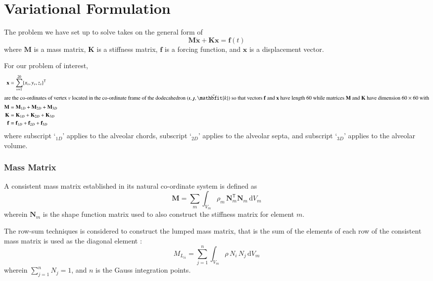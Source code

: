 \setcounter{section}{0}
\part{Variational Formulation}
\label{partVariational}

The problem we have set up to solve takes on the general form of 
\begin{equation}
	\mathbf{M} \ddot{\mathbf{x}} + \mathbf{K} \mathbf{x} = \mathbf{f}(t)
\end{equation}
where $\mathbf{M}$ is a mass matrix, $\mathbf{K}$ is a stiffness matrix, $\mathbf{f}$ is a forcing function, and $\mathbf{x}$ is a displacement vector.  

For our problem of interest, 
\begin{subequations}
\begin{align}
	\mathbf{x} & = \sum_{v=1}^{20} \{ x_v , y_v , z_v \}^{\mathsf{T}} \\
	\intertext{are the co-ordinates of vertex $v$ located in the co-ordinate frame of the dodecahedron $(\boldsymbol{\imath} , \boldsymbol{\jmath} , \vec{\mathbfit{k}} )$ so that vectors $\mathbf{f}$ and $\mathbf{x}$ have length 60 while matrices $\mathbf{M}$ and $\mathbf{K}$ have dimension $60 \times 60$ with}
	\mathbf{M} & = \mathbf{M}_{1D} + \mathbf{M}_{2D} + \mathbf{M}_{3D} \\
	\mathbf{K} & = \mathbf{K}_{1D} + \mathbf{K}_{2D} + \mathbf{K}_{3D} \\
	\mathbf{f} & = \mathbf{f}_{1D} + \mathbf{f}_{2D} + \mathbf{f}_{3D}
\end{align}
\end{subequations}
where subscript `$\mbox{}_{1D}$' applies to the alveolar chords, subscript `$\mbox{}_{2D}$' applies to the alveolar septa, and subscript `$\mbox{}_{3D}$' applies to the alveolar volume.

\section{Mass Matrix}
A consistent mass matrix \cite{Archer65} established in its natural co-ordinate system is defined as
\begin{equation}
	\mathbf{M} = \sum_m \int_{V_m} \rho_m \, \mathbf{N}_m^{\mathsf{T}} \mathbf{N}_m \,
	\mathrm{d} V_m
	\label{consistentMassMatrix}
\end{equation}
wherein $\mathbf{N}_m$ is the shape function matrix used to also construct the stiffness matrix for element $m$.

The row-sum techniques is considered to construct the lumped mass matrix, that is the sum of the elements of each row of the consistent mass matrix is used as the diagonal element \cite{Reddy93}:
\begin{equation}
{M}_{L_{ii}} = \sum_{j=1}^n \int_{V_m} \rho \, N_i \, N_j \, \mathrm{d}  V_m 
\end{equation}
wherein $\sum_{j=1}^n N_j = 1$, and $n$ is the Gauss integration points.

